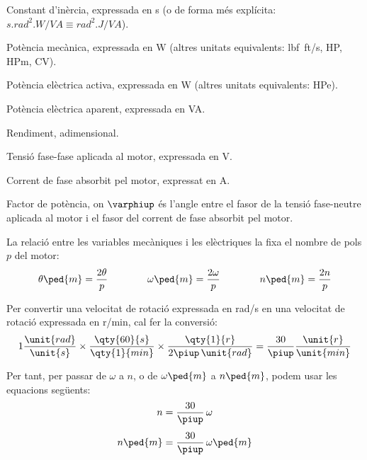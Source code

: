 \begin{list}{}
   \item[$H$] Constant d'inèrcia, expressada en \unit{s} (o de forma més explícita:
   $\unit{s.rad^2.W/VA} \equiv \unit{rad^2.J/VA}$).
   \item[$P\ped{m}$] Potència mecànica, expressada en \unit{W} (altres unitats equivalents: \unit{lbf.ft/s}, \unit{HP},  \unit{HPm}, \unit{CV}).
   \item[$P$] Potència elèctrica activa, expressada en \unit{W} (altres unitats equivalents: \unit{HPe}).
   \item[$S$] Potència elèctrica aparent, expressada en \unit{VA}.
   \item[$\eta$] Rendiment, adimensional.
   \item[$U$] Tensió fase-fase aplicada al motor, expressada en \unit{V}.
   \item[$I$] Corrent de fase absorbit pel motor, expressat en \unit{A}.
   \item[$\cos\varphiup$] Factor de potència, on $\varphiup$ és l'angle entre el fasor de la tensió fase-neutre aplicada al motor i el fasor del corrent de fase absorbit pel motor.
\end{list}

La relació entre les variables mecàniques i les elèctriques la fixa el nombre de pols $p$ del motor:
\begin{equation}\label{eq:vel-ele-mec}
    \theta\ped{m} = \frac{2\theta}{p} \qquad\qquad
    \omega\ped{m} = \frac{2\omega}{p} \qquad\qquad
    n\ped{m} = \frac{2n}{p}
\end{equation}

Per  convertir una velocitat de rotació expressada en \unit{rad/s} en una velocitat de rotació expressada en \unit{r/min}, cal fer la conversió:
\begin{equation}
 1\frac{\unit{rad}}{\unit{s}} \times \frac{\qty{60}{s}}{\qty{1}{min}} \times \frac{\qty{1}{r}}{2\piup\,\unit{rad}} = \frac{30}{\piup}\frac{\unit{r}}{\unit{min}}
 \end{equation}

 Per tant, per passar de $\omega$ a $n$, o de $\omega\ped{m}$ a $n\ped{m}$, podem usar les equacions següents:
\begin{subequations}\index{motors d'inducció!velocitat}
\begin{align}
    n        &= \frac{30}{\piup} \,\omega \\[1ex]
    n\ped{m} &= \frac{30}{\piup} \,\omega\ped{m}
\end{align}
\end{subequations}

